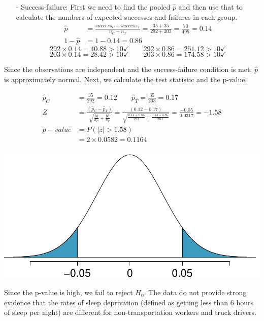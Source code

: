\documentclass[11pt]{article}
\begin{document}
\begin{enumerate}
\begin{itemize}
\item[-] Success-failure: First we need to find the pooled $\hat{p}$ and then use that to calculate the numbers of expected successes and failures in each group.
\begin{align*} 
\hat{p} &= \frac{success_{C} + success_{T}}{n_{C} + n_{T}} = \frac{35 + 35}{292 + 203} = \frac{70}{495} = 0.14 \\
1 - \hat{p} &= 1 - 0.14 =  0.86
\end{align*}
\[ 292 \times  0.14 = 40.88 > 10 \checkmark \qquad 292 \times  0.86 = 251.12 > 10 \checkmark \]
\[ 203 \times  0.14 = 28.42 > 10 \checkmark \qquad 203 \times  0.86 = 174.58 > 10 \checkmark \]
\end{itemize}

Since the observations are independent and the success-failure condition is met, $\hat{p}$ is approximately normal. Next, we calculate the test statistic and the p-value:

\begin{minipage}{0.6\textwidth}
\begin{align*}
\hat{p}_C &= \frac{35}{292} = 0.12 \qquad \hat{p}_T = \frac{35}{203} = 0.17 \\
Z &= \frac{(\hat{p}_C - \hat{p}_T)}{\sqrt{\frac{\hat{p} \hat{q}}{n_C} + \frac{\hat{p} \hat{q}}{n_T}}} = \frac{(0.12 - 0.17)}{\sqrt{\frac{0.14 \times  0.86}{292} + \frac{0.14 \times  0.86}{203}}} = \frac{-0.05}{0.0317} = -1.58 \\
p-value &= P(|z| > 1.58) \\
&= 2 \times 0.0582 = 0.1164 
\end{align*}
\end{minipage}
\begin{minipage}{0.4\textwidth}
\includegraphics[width=\textwidth]{figures/sleepTransport_pval}
\end{minipage}

Since the p-value is high, we fail to reject $H_0$. The data do not provide strong evidence that the rates of sleep deprivation (defined as getting less than 6 hours of sleep per night) are different for non-transportation workers and truck drivers.


\end{enumerate}
\end{document}

